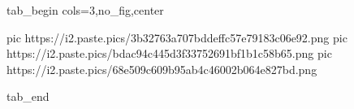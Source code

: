  
 
 
 
 


\ifcmt
  tab_begin cols=3,no_fig,center

     pic https://i2.paste.pics/3b32763a707bddeffc57e79183c06e92.png
		 pic https://i2.paste.pics/bdac94c445d3f33752691bf1b1c58b65.png
		 pic https://i2.paste.pics/68e509c609b95ab4c46002b064e827bd.png

  tab_end
\fi

